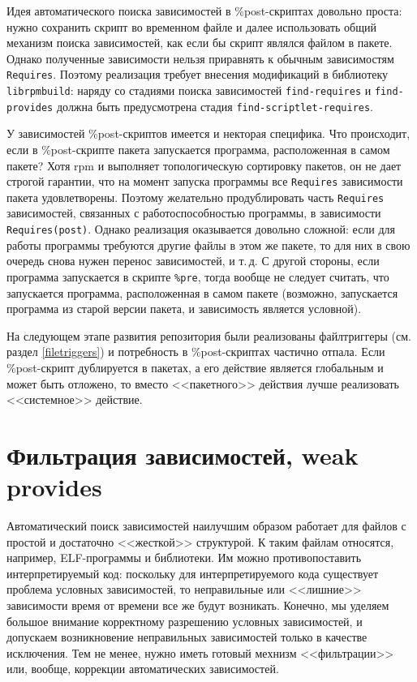 \documentclass[russian,a4paper,12pt,titlepage]{article}
\begin{document}
Идея автоматического поиска зависимостей в \%post-скриптах довольно проста: нужно сохранить
скрипт во временном файле и далее использовать общий механизм поиска зависимостей, как если бы скрипт
являлся файлом в пакете.  Однако полученные зависимости нельзя приравнять к обычным зависимостям \verb|Requires|.
Поэтому реализация требует внесения модификаций в библиотеку \verb|librpmbuild|:
наряду со стадиями поиска зависимостей \verb|find-requires| и \verb|find-provides| должна быть предусмотрена
стадия \verb|find-scriptlet-requires|.

У зависимостей \%post-скриптов имеется и некторая специфика.  Что происходит, если в \%post-скрипте пакета
запускается программа, расположенная в самом пакете?  Хотя rpm и выполняет топологическую сортировку пакетов,
он не дает строгой гарантии, что на момент запуска программы все \verb|Requires| зависимости пакета удовлетворены.
Поэтому желательно продублировать часть \verb|Requires| зависимостей, связанных с работоспособностью программы,
в зависимости \verb|Requires(post)|.  Однако реализация оказывается довольно сложной: если для работы программы
требуются другие файлы в этом же пакете, то для них в свою очередь снова нужен перенос зависимостей, и т.\,д.
С другой стороны, если программа запускается в скрипте \verb|%pre|, тогда вообще не следует считать, что
запускается программа, расположенная в самом пакете (возможно, запускается программа из старой версии пакета,
и зависимость является условной).

На следующем этапе развития репозитория были реализованы файлтриггеры (см. раздел \ref{filetriggers})
и потребность в \%post-скриптах частично отпала.  Если \%post-скрипт дублируется в пакетах, а его действие
является глобальным и может быть отложено, то вместо <<пакетного>> действия лучше реализовать <<системное>> действие.

\section{Фильтрация зависимостей, weak provides}
\label{filter-deps}
Автоматический поиск зависимостей наилучшим образом работает для файлов с простой и достаточно <<жесткой>> структурой.
К таким файлам относятся, например, ELF-программы и библиотеки.  Им можно противопоставить интерпретируемый код:
поскольку для интерпретируемого кода существует проблема условных зависимостей, то неправильные или <<лишние>>
зависимости время от времени все же будут возникать.  Конечно, мы уделяем большое внимание корректному разрешению
условных зависимостей, и допускаем возникновение неправильных зависимостей только в качестве исключения.  Тем не менее,
нужно иметь готовый мехнизм <<фильтрации>> или, вообще, коррекции автоматических зависимостей.
\end{document}
